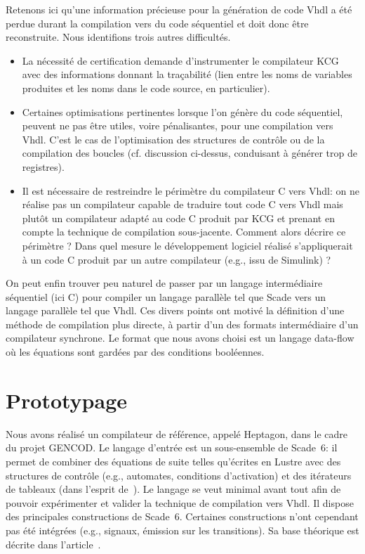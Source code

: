 \documentclass[a4paper]{article}
\newcommand{\LANG}{{\sc Heptagon}}
\newcommand{\lustre}{{\sc Lustre}}
\newcommand{\scade}{{\sc Scade}}
\newcommand{\scadesix}{{\sc Scade~6}}
\newcommand{\vhdl}{{\sc Vhdl}}
\begin{document}
Retenons ici qu'une information pr\'ecieuse pour la g\'en\'eration
de code \vhdl{} a \'et\'e perdue durant la compilation vers du code s\'equentiel et
doit donc \^etre reconstruite. Nous identifions trois autres
difficult\'es.
\begin{itemize}
\item La n\'ecessit\'e de certification demande d'instrumenter le
  compilateur KCG avec des informations donnant la tra\c{c}abilit\'e (lien
  entre les noms de variables produites et les noms dans le code
  source, en particulier).
\item Certaines optimisations pertinentes lorsque l'on g\'en\`ere du code
  s\'equentiel, peuvent ne pas \^etre utiles, voire p\'enalisantes, pour une
  compilation vers \vhdl{}. C'est le cas de l'optimisation des structures
  de contr\^ole ou de la compilation des boucles (cf. discussion
  ci-dessus, conduisant \`a g\'en\'erer trop de registres).
\item Il est n\'ecessaire de restreindre le p\'erim\`etre du compilateur C
  vers \vhdl{}: on ne r\'ealise pas un compilateur capable de traduire tout
  code C vers \vhdl{} mais plut\^ot un compilateur adapt\'e au code C produit
  par KCG et prenant en compte la technique de compilation
  sous-jacente. Comment alors d\'ecrire ce p\'erim\`etre ? Dans quel mesure
  le d\'eveloppement logiciel r\'ealis\'e s'appliquerait \`a un code C produit
  par un autre compilateur (e.g., issu de Simulink) ?
\end{itemize}

On peut enfin trouver peu naturel de passer par un langage
  interm\'ediaire s\'equentiel (ici C) pour compiler un langage parall\`ele
  tel que \scade{} vers un langage parall\`ele tel que \vhdl. Ces divers points
ont motiv\'e la d\'efinition d'une m\'ethode de compilation plus directe,
\`a partir d'un des formats interm\'ediaire d'un compilateur synchrone. Le format
que nous avons choisi est un langage data-flow o\`u les \'equations
sont gard\'ees par des conditions bool\'eennes.

\section{Prototypage}
Nous avons r\'ealis\'e un compilateur de r\'ef\'erence, appel\'e \LANG{}, dans le
cadre du projet GENCOD. Le
langage d'entr\'ee est un sous-ensemble de \scadesix: il permet de
combiner des \'equations de suite telles qu'\'ecrites en \lustre{} avec des
structures de contr\^ole (e.g., automates, conditions d'activation)
et des it\'erateurs de tableaux (dans l'esprit
de~\cite{lucy:genie00,morel-07-jes}). Le langage se veut minimal avant
tout afin de pouvoir exp\'erimenter et valider la technique de compilation
vers \vhdl. Il dispose des
principales constructions de \scadesix. Certaines constructions n'ont
cependant pas \'et\'e int\'egr\'ees (e.g., signaux, \'emission sur les
transitions). Sa base th\'eorique est d\'ecrite dans l'article~\cite{lucy:lctes08a}.
\end{document}
